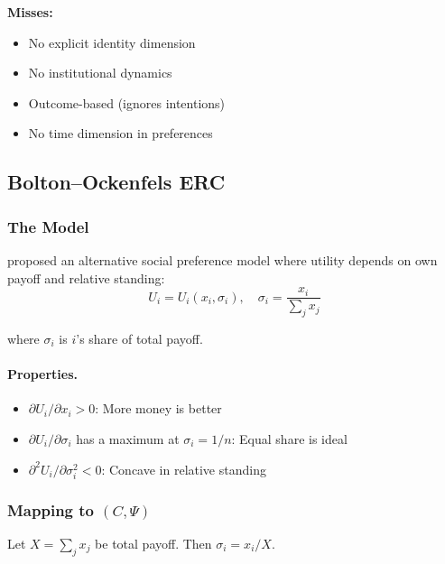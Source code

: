 \textbf{Misses:}
\begin{itemize}
  \item No explicit identity dimension
  \item No institutional dynamics
  \item Outcome-based (ignores intentions)
  \item No time dimension in preferences
\end{itemize}

\subsection{Bolton--Ockenfels ERC}
\label{app:boltonockenfels}

\subsubsection{The Model}

\citet{boltonockenfels} proposed an alternative social preference model
where utility depends on own payoff and relative standing:
\begin{equation}
  U_i = U_i\left(x_i, \sigma_i\right), \quad \sigma_i = \frac{x_i}{\sum_j x_j}
  \label{eq:ercutility}
\end{equation}

where $\sigma_i$ is $i$'s share of total payoff.

\paragraph{Properties.}
\begin{itemize}
  \item $\partial U_i / \partial x_i > 0$: More money is better
  \item $\partial U_i / \partial \sigma_i$ has a maximum at $\sigma_i = 1/n$: Equal share is ideal
  \item $\partial^2 U_i / \partial \sigma_i^2 < 0$: Concave in relative standing
\end{itemize}

\subsubsection{Mapping to $(C, \Psi)$}

Let $X = \sum_j x_j$ be total payoff. Then $\sigma_i = x_i / X$.


